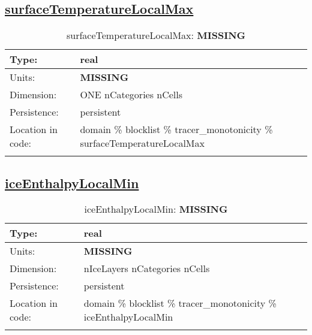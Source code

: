 \subsection[surfaceTemperatureLocalMax]{\hyperref[sec:var_tab_tracer_monotonicity]{surfaceTemperatureLocalMax}}
\label{subsec:var_sec_tracer_monotonicity_surfaceTemperatureLocalMax}
\begin{center}
\begin{longtable}{| p{2.0in} | p{4.0in} |}
        \hline 
        Type: & real \\
        \hline 
        Units: & {\bf \color{red} MISSING} \\
        \hline 
        Dimension: & ONE nCategories nCells \\
        \hline 
        Persistence: & persistent \\
        \hline 
         Location in code: & domain \% blocklist \% tracer\_monotonicity \% surfaceTemperatureLocalMax \\
         \hline 
    \caption{surfaceTemperatureLocalMax: {\bf \color{red} MISSING}}
\end{longtable}
\end{center}
\subsection[iceEnthalpyLocalMin]{\hyperref[sec:var_tab_tracer_monotonicity]{iceEnthalpyLocalMin}}
\label{subsec:var_sec_tracer_monotonicity_iceEnthalpyLocalMin}
\begin{center}
\begin{longtable}{| p{2.0in} | p{4.0in} |}
        \hline 
        Type: & real \\
        \hline 
        Units: & {\bf \color{red} MISSING} \\
        \hline 
        Dimension: & nIceLayers nCategories nCells \\
        \hline 
        Persistence: & persistent \\
        \hline 
         Location in code: & domain \% blocklist \% tracer\_monotonicity \% iceEnthalpyLocalMin \\
         \hline 
    \caption{iceEnthalpyLocalMin: {\bf \color{red} MISSING}}
\end{longtable}
\end{center}
